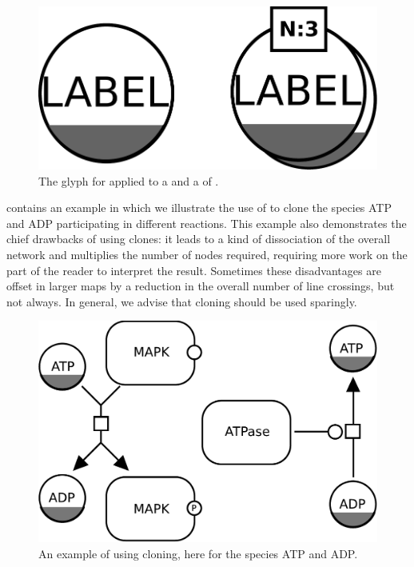 \begin{figure}[H]
  \centering
  \includegraphics[scale = 0.3]{images/simpleCloneMarker}
  \caption{The \PD glyph for  applied to a  and a  of .}
  \label{fig:simpleCloneMarker}
\end{figure}

 contains an example in which we illustrate the use of  to clone the species ATP and ADP participating in different reactions.  This example also demonstrates the chief drawbacks of using clones: it leads to a kind of dissociation of the overall network and multiplies the number of nodes required, requiring more work on the part of the reader to interpret the result.  Sometimes these disadvantages are offset in larger maps by a reduction in the overall number of line crossings, but not always.  In general, we advise that cloning should be used sparingly.

\begin{figure}[H]
  \centering
  \includegraphics[scale = 0.5]{examples/cloning}
  \caption{An example of using cloning, here for the species ATP and ADP.}
  \label{fig:example-cloning}
\end{figure}

